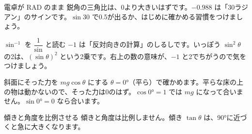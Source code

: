 \begin{tsumazuki}{電卓が RAD のまま}
鋭角の三角比は、0より大きいはずです。$-0.988$ は「30ラジアン」のサインです。$\sin30$ で0.5が出るか、はじめに確かめる習慣をつけましょう。
\end{tsumazuki}

\begin{tsumazuki}{$\sin^{-1}$ を $\dfrac{1}{\sin}$ と読む}
$-1$ は「反対向きの計算」のしるしです。いっぽう $\sin^2\theta$ の2は、$(\sin\theta)^2$ という2乗です。右上の数の意味が、$-1$ と2でちがうので気をつけましょう。
\end{tsumazuki}

\begin{tsumazuki}{斜面にそった力を $mg\cos\theta$ にする}
$\theta=\ang{0}$（平ら）で確かめます。平らな床の上の物は動かないので、そった力は0のはず。$\cos\ang{0}=1$ では $mg$ になって合いません。$\sin\ang{0}=0$ なら合います。
\end{tsumazuki}

\begin{tsumazuki}{傾きと角度を比例させる}
傾きと角度は比例しません。傾き $\tan\theta$ は、\ang{90}に近づくと急に大きくなります。
\end{tsumazuki}

